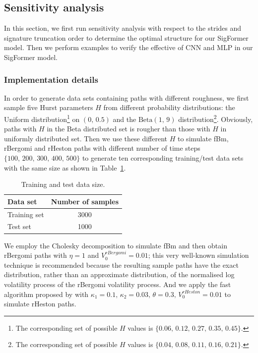 \documentclass[]{article}
\renewcommand{\(}{\left(}
\renewcommand{\)}{\right)}
\begin{document}
	\subsection{Sensitivity analysis}
	\label{subsec-sensitivity}
	In this section, we first run sensitivity analysis with respect to the strides and signature truncation order to determine the optimal structure for our SigFormer model. Then we perform examples to verify the effective of CNN and MLP in our SigFormer model.
	
	\subsubsection{Implementation details}
	\label{subsubsec-sensitivity-implementation}
	In order to generate data sets containing paths with different roughness, we first sample five Hurst parameters $H$ from different probability distributions: the Uniform distribution\footnote{The corresponding set of possible $H$ values is $\{0.06,\,0.12,\,0.27,\,0.35,\,0.45\}$.} on $(0,\,0.5)$ and the $\text{Beta}(1,\,9)$ distribution\footnote{The corresponding set of possible $H$ values is $\{0.04,\,0.08,\,0.11,\,0.16,\,0.21\}$.}. Obviously, paths with $H$ in the Beta distributed set is rougher than those with $H$ in uniformly distributed set. Then we use these different $H$ to simulate fBm, rBergomi and rHeston paths with different number of time steps $\{100,\,200,\,300,\,400,\,500\}$ to generate ten corresponding training/test data sets with the same size as shown in Table~\ref{tab-data-size}.
	\begin{table}[H]
		\caption{Training and test data size.}
		\label{tab-data-size}
		\smallskip
		\centering
		\renewcommand\arraystretch{1.5}
		\begin{tabular}{l c}
			\toprule
			Data set&Number of samples\\
			\hline
			Training set&3000\\
			Test set&1000\\	
			\bottomrule
		\end{tabular}
	\end{table}
	We employ the Cholesky decomposition to simulate fBm and then obtain rBergomi paths with $\eta=1$ and $V_0^{rBergomi}=0.01$; this very well-known simulation technique is recommended because the resulting sample paths have the exact distribution, rather than an approximate distribution, of the normalised log volatility process of the rBergomi volatility process. And we apply the fast algorithm proposed by \cite{ma_2022_fast} with $\kappa_1=0.1,\,\kappa_2=0.03,\,\theta=0.3,\,V_0^{rHeston}=0.01$ to simulate rHeston paths. 
	
\end{document}
